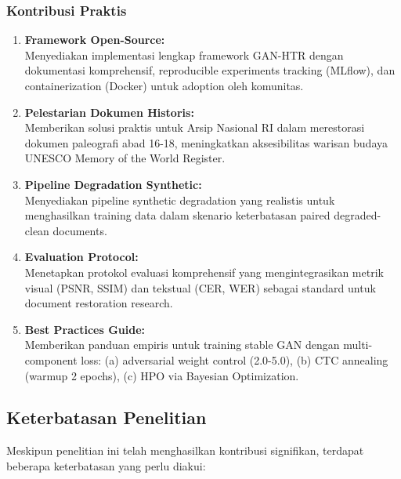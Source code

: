 \documentclass[12pt,a4paper]{article}
\begin{document}
\subsubsection{Kontribusi Praktis}

\begin{enumerate}[label=\arabic*., leftmargin=0.5cm]
    \item \textbf{Framework Open-Source:} \\
    [PLACEHOLDER jika akan open-source] Menyediakan implementasi lengkap framework GAN-HTR dengan dokumentasi komprehensif, reproducible experiments tracking (MLflow), dan containerization (Docker) untuk adoption oleh komunitas.
    
    \item \textbf{Pelestarian Dokumen Historis:} \\
    Memberikan solusi praktis untuk Arsip Nasional RI dalam merestorasi dokumen paleografi abad 16-18, meningkatkan aksesibilitas warisan budaya UNESCO Memory of the World Register.
    
    \item \textbf{Pipeline Degradation Synthetic:} \\
    Menyediakan pipeline synthetic degradation yang realistis untuk menghasilkan training data dalam skenario keterbatasan paired degraded-clean documents.
    
    \item \textbf{Evaluation Protocol:} \\
    Menetapkan protokol evaluasi komprehensif yang mengintegrasikan metrik visual (PSNR, SSIM) dan tekstual (CER, WER) sebagai standard untuk document restoration research.
    
    \item \textbf{Best Practices Guide:} \\
    Memberikan panduan empiris untuk training stable GAN dengan multi-component loss: (a) adversarial weight control (2.0-5.0), (b) CTC annealing (warmup 2 epochs), (c) HPO via Bayesian Optimization.
\end{enumerate}

\subsection{Keterbatasan Penelitian}
\label{subsec:keterbatasan}
\vspace{0.8em}

Meskipun penelitian ini telah menghasilkan kontribusi signifikan, terdapat beberapa keterbatasan yang perlu diakui:
\end{document}
